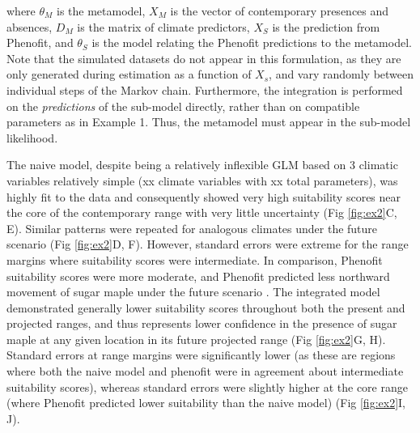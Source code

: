 where \(\theta_M\) is the metamodel, 
\(X_M\) is the vector of contemporary presences and absences, 
\(D_M\) is the matrix of climate predictors,
\(X_S\) is the prediction from Phenofit,
and \(\theta_S\) is the model relating the Phenofit predictions to the metamodel.
Note that the simulated datasets do not appear in this formulation, as they are only generated during estimation as a function of \(X_s\), and vary randomly between individual steps of the Markov chain.
Furthermore, the integration is performed on the \emph{predictions} of the sub-model directly, rather than on compatible parameters as in Example 1. 
Thus, the metamodel must appear in the sub-model likelihood.

The naive model, despite being a relatively inflexible GLM based on 3 climatic variables
relatively simple (xx climate variables with xx total parameters), was highly fit to the data and consequently showed very high suitability scores near the core of the contemporary range with very little uncertainty (Fig \ref{fig:ex2}C, E).
Similar patterns were repeated for analogous climates under the future scenario (Fig \ref{fig:ex2}D, F).
However, standard errors were extreme for the range margins where suitability scores were intermediate.
In comparison, Phenofit suitability scores were more moderate, and Phenofit predicted less northward movement of sugar maple under the future scenario \citep[Fig. \ref{fig:ex2}A, B;][]{Morin2009}.
The integrated model demonstrated generally lower suitability scores throughout both the present and projected ranges, and thus represents lower confidence in the presence of sugar maple at any given location in its future projected range (Fig \ref{fig:ex2}G, H).
Standard errors at range margins were significantly lower (as these are regions where both the naive model and phenofit were in agreement about intermediate suitability scores), whereas standard errors were slightly higher at the core range (where Phenofit predicted lower suitability than the naive model) (Fig \ref{fig:ex2}I, J).


